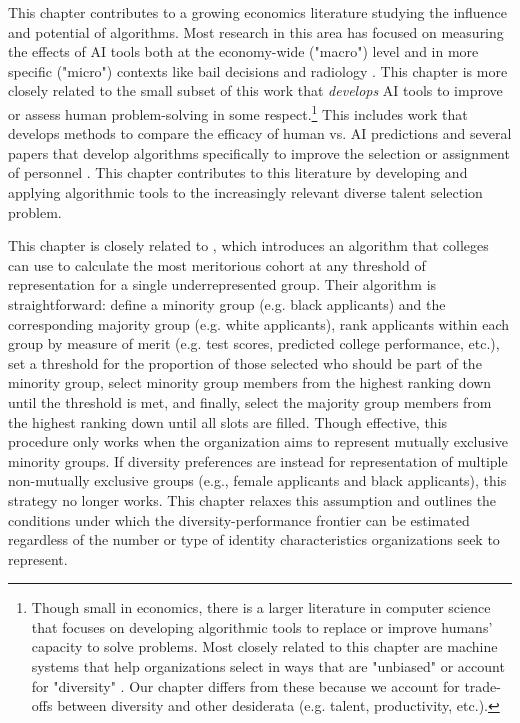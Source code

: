This chapter contributes to a growing economics literature studying the influence and potential of algorithms. Most research in this area has focused on measuring the effects of AI tools both at the economy-wide ("macro") level \cite{acemoglu2022automation,babina2024artificial,calvino2023portrait,zolas2021advanced,webb2019impact} and in more specific ("micro") contexts like bail decisions and radiology \cite{albright2023hidden,kleinberg2015prediction,stevenson2019algorithmic,angelova2023algorithmic,imai2023experimental,grimon2022impact,noy2023experimental,brynjolfsson2023generative,bundorf2019humans, mullainathan2019machine, ribers2020machine, agarwal2023combining}. This chapter is more closely related to the small subset of this work that \emph{develops} AI tools to improve or assess human problem-solving in some respect.\footnote{Though small in economics, there is a larger literature in computer science that focuses on developing algorithmic tools to replace or improve humans' capacity to solve problems. Most closely related to this chapter are machine systems that help organizations select in ways that are "unbiased" \cite{tambe2019artificial,raghavan2020mitigating} or account for "diversity" \cite{gillet_diversity_2011,huppenkothen2020entrofy}. Our chapter differs from these because we account for trade-offs between diversity and other desiderata (e.g. talent, productivity, etc.).}  This includes work that develops methods to compare the efficacy of human vs. AI predictions \cite{kleinberg2018human,rambachan2024identifying} and several papers that develop algorithms specifically to improve the selection or assignment of personnel \cite{li2020hiring,bergman2021seven,kleinberg2018algorithmic,huppenkothen2020entrofy}. This chapter contributes to this literature by developing and applying algorithmic tools to the increasingly relevant diverse talent selection problem. 

This chapter is closely related to \textcite{kleinberg2018algorithmic}, which introduces an algorithm that colleges can use to calculate the most meritorious cohort at any threshold of representation for a single underrepresented group. Their algorithm is straightforward: define a minority group (e.g. black applicants) and the corresponding majority group (e.g. white applicants), rank applicants within each group by measure of merit (e.g. test scores, predicted college performance, etc.), set a threshold for the proportion of those selected who should be part of the minority group, select minority group members from the highest ranking down until the threshold is met, and finally, select the majority group members from the highest ranking down until all slots are filled. Though effective, this procedure only works when the organization aims to represent mutually exclusive minority groups. If diversity preferences are instead for representation of multiple non-mutually exclusive groups (e.g., female applicants and black applicants), this strategy no longer works. This chapter relaxes this assumption and outlines the conditions under which the diversity-performance frontier can be estimated regardless of the number or type of identity characteristics organizations seek to represent.

